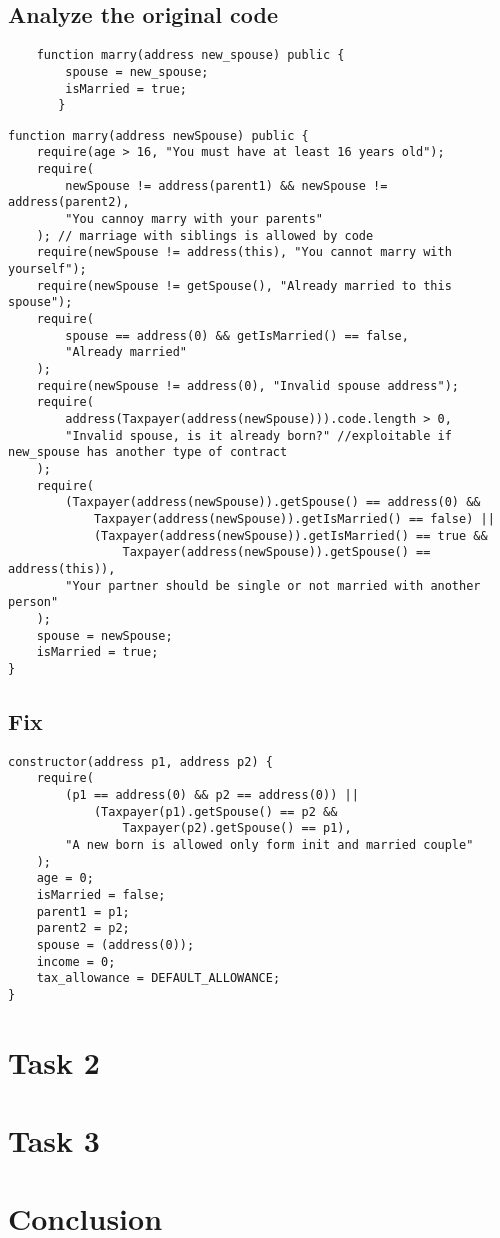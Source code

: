 \documentclass{article}
\begin{document}
\subsection{Analyze the original code}
\begin{verbatim}
    function marry(address new_spouse) public {
        spouse = new_spouse;
        isMarried = true;
       }
    \end{verbatim}
\begin{verbatim}
function marry(address newSpouse) public {
    require(age > 16, "You must have at least 16 years old");
    require(
        newSpouse != address(parent1) && newSpouse != address(parent2),
        "You cannoy marry with your parents"
    ); // marriage with siblings is allowed by code
    require(newSpouse != address(this), "You cannot marry with yourself");
    require(newSpouse != getSpouse(), "Already married to this spouse");
    require(
        spouse == address(0) && getIsMarried() == false,
        "Already married"
    );
    require(newSpouse != address(0), "Invalid spouse address");
    require(
        address(Taxpayer(address(newSpouse))).code.length > 0,
        "Invalid spouse, is it already born?" //exploitable if new_spouse has another type of contract
    );
    require(
        (Taxpayer(address(newSpouse)).getSpouse() == address(0) &&
            Taxpayer(address(newSpouse)).getIsMarried() == false) ||
            (Taxpayer(address(newSpouse)).getIsMarried() == true &&
                Taxpayer(address(newSpouse)).getSpouse() == address(this)),
        "Your partner should be single or not married with another person"
    );
    spouse = newSpouse;
    isMarried = true;
}
\end{verbatim}
\subsection{Fix}

    
\begin{verbatim}
constructor(address p1, address p2) {
    require(
        (p1 == address(0) && p2 == address(0)) ||
            (Taxpayer(p1).getSpouse() == p2 &&
                Taxpayer(p2).getSpouse() == p1),
        "A new born is allowed only form init and married couple"
    );
    age = 0;
    isMarried = false;
    parent1 = p1;
    parent2 = p2;
    spouse = (address(0));
    income = 0;
    tax_allowance = DEFAULT_ALLOWANCE;
}
\end{verbatim}


\section{Task 2}
\section{Task 3}

\section{Conclusion}
    \lipsum[6]  %

\printbibliography
\end{document}
